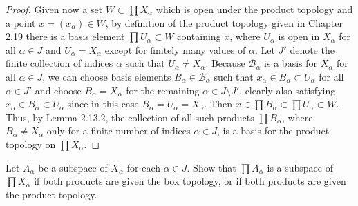 \documentclass[a4paper,10pt]{article}
\begin{document}
\begin{solution}
\begin{proof}
        Given now a set $W \subset \prod X_\alpha$ which is open under the product topology and a point $x = (x_\alpha) \in W$, by definition of the product topology given in Chapter 2.19 there is a basis element $\prod U_\alpha \subset W$ containing $x$, where $U_\alpha$ is open in $X_\alpha$ for all $\alpha \in J$ and $U_\alpha = X_\alpha$ except for finitely many values of $\alpha$.
        Let $J'$ denote the finite collection of indices $\alpha$ such that $U_\alpha \neq X_\alpha$.
        Because $\mathscr{B}_\alpha$ is a basis for $X_\alpha$ for all $\alpha \in J$, we can choose basis elements $B_\alpha \in \mathscr{B}_\alpha$ such that $x_\alpha \in B_\alpha \subset U_\alpha$ for all $\alpha \in J'$ and choose $B_\alpha = X_\alpha$ for the remaining $\alpha \in J \setminus J'$, clearly also satisfying $x_\alpha \in B_\alpha \subset U_\alpha$ since in this case $B_\alpha = U_\alpha = X_\alpha$.
        Then $x \in \prod B_\alpha \subset \prod U_\alpha \subset W$.
        Thus, by Lemma 2.13.2, the collection of all such products $\prod B_\alpha$, where $B_\alpha \neq X_\alpha$ only for a finite number of indices $\alpha \in J$, is a basis for the product topology on $\prod X_\alpha$.
    \end{proof}
\end{solution}
\newpage

\begin{exercise}[ID=2.19.2]
    Let $A_\alpha$ be a subspace of $X_\alpha$ for each $\alpha \in J$.
    Show that $\prod A_\alpha$ is a subspace of $\prod X_\alpha$ if both products are given the box topology, or if both products are given the product topology.
\end{exercise}
\end{document}
